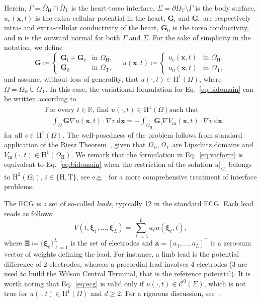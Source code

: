 \documentclass[runningheads]{llncs}
\newcommand{\bs}[1]{\boldsymbol{#1}}
\newcommand{\ue}{u_\mathrm{e}}
\newcommand{\Vm}{V_\mathrm{m}}
\newcommand{\vx}{\mathbf{x}}
\newcommand{\vn}{\mathbf{n}}
\newcommand{\tA}{\mathbf{a}}
\newcommand{\tG}{\mathbf{G}}
\newcommand{\tGi}{\tG_\mathrm{i}}
\newcommand{\tGe}{\tG_\mathrm{e}}
\newcommand{\R}{\mathbb{R}}
\newcommand{\dd}{\mathrm{d}}
\newcommand{\OmegaH}{\Omega_\mathrm{H}}
\newcommand{\OmegaT}{\Omega_\mathrm{T}}
\begin{document}
Herein, $\Gamma = \bar\Omega_\mathrm{H}\cap\bar\Omega_\mathrm{T}$ is the
heart-torso interface, $\Sigma = \partial\OmegaT\setminus\Gamma$ is the body
surface, $\ue(\vx,t)$ is the extra-cellular potential in the heart,
$\tGi$ and $\tGe$ are respectively intra- and extra-cellular conductivity
of the heart, $\tG_0$ is the torso
conductivity, and $\vn$ is the outward normal for both $\Gamma$ and $\Sigma$.
For the sake of simplicity in the notation, we define
\[
\tG \coloneqq
\begin{cases}
\tGi+\tGe &\text{in }\OmegaH, \\
\tG_0 &\text{in }\OmegaT,
\end{cases}
\quad
u(\vx,t) \coloneqq
\begin{cases}
\ue(\vx,t) & \text{in }\OmegaH, \\
u_0(\vx,t) & \text{in }\OmegaT,
\end{cases}
\]
and assume, without loss of generality, that
$u(\cdot,t)\in\mathrm{H}^1(\Omega)$, where $\Omega = \OmegaH \cup \OmegaT$.
In this case, the variational formulation for Eq.~\eqref{eq:bidomain}
can be written according to 
\begin{equation}\label{eq:varform}
\begin{aligned}
&\text{For every $t\in\R$, find $u(\cdot,t)\in\mathrm{H}^1(\Omega)$
such that}\\
&\quad\int_{\Omega} \tG\nabla u(\vx,t) \cdot\nabla v \:\dd\vx
= - \int_{\OmegaH}
\tGi \nabla\Vm(\vx,t) \cdot\nabla v \:\dd\vx
\end{aligned}
\end{equation}
for all $v\in \mathrm{H}^1(\Omega)$. The well-posedness of the problem follows from
standard application of the Riesz Theorem~\cite{evans2010},
given that $\OmegaH, \OmegaT$ are Lipschitz domains and
$\Vm(\cdot,t)\in\mathrm{H}^1(\OmegaH)$.  We remark that the formulation in Eq.~\eqref{eq:varform} is equivalent to Eq.~\eqref{eq:bidomain} when the
restriction of the solution $u|_{\Omega_i}$ belongs to $\mathrm{H}^2(\Omega_i)$,
\(i\in\{\text{H},\text{T}\}\), see e.g.~\cite{ammari2016,chen1998} for a more 
comprehensive
treatment of interface problems.

The ECG is a set of so-called \emph{leads}, typically 12 in the standard ECG.
Each lead reads as follows:
\begin{equation}\label{eq:ecg}
V(t,{\bs\xi}_1,\ldots,{\bs\xi}_L) = \sum_{\ell=1}^L a_\ell u({\bs\xi}_\ell,t),
\end{equation}
where ${\bs\Xi}\coloneqq \{{\bs\xi}_\ell \}_{\ell=1}^L$ is the set of electrodes
and $\tA = [a_1,\ldots,a_L]^\top$ is a zero-sum vector of weights defining the
lead. For instance, a limb lead is the potential difference of 2 electrodes,
whereas a precordial lead involves 4 electrodes (3 are used to build the
Wilson Central Terminal, that is the reference potential).
It is worth noting that Eq.~\eqref{eq:ecg} is valid only
if $u(\cdot,t)\in\mathcal{C}^0(\Sigma)$, which is not true for
$u(\cdot,t)\in\mathrm{H}^1(\Omega)$ and $d\ge 2$. For a rigorous discussion, see~\cite{colli2014}.
\end{document}

